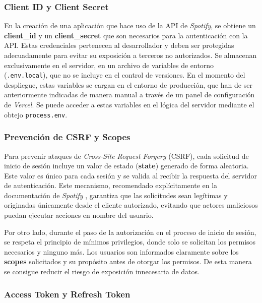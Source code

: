 \subsubsection*{Client ID y Client Secret}

En la creación de una aplicación que hace uso de la API de \textit{Spotify}, se obtiene un \textbf{client\_id} y un \textbf{client\_secret} que son necesarios para la autenticación con la API. Estas credenciales pertenecen al desarrollador y deben ser protegidas adecuadamente para evitar su exposición a terceros no autorizados. Se almacenan exclusivamente en el servidor, en un archivo de variables de entorno (\texttt{.env.local}), que no se incluye en el control de versiones. En el momento del despliegue, estas variables se cargan en el entorno de producción, que han de ser anteriormente indicadas de manera manual a través de un panel de configuración de \textit{Vercel}. Se puede acceder a estas variables en el lógica del servidor mediante el obtejo \texttt{process.env}.

\subsubsection*{Prevención de CSRF y Scopes}

Para prevenir ataques de \textit{Cross-Site Request Forgery} (CSRF), cada solicitud de inicio de sesión incluye un valor de estado (\textbf{state}) generado de forma aleatoria. Este valor es único para cada sesión y se valida al recibir la respuesta del servidor de autenticación. Este mecanismo, recomendado explícitamente en la documentación de \textit{Spotify} \cite{spotifyAuthCodeFlow2025}, garantiza que las solicitudes sean legítimas y originadas únicamente desde el cliente autorizado, evitando que actores maliciosos puedan ejecutar acciones en nombre del usuario.

Por otro lado, durante el paso de la autorización en el proceso de inicio de sesión, se respeta el principio de mínimos privilegios, donde solo se solicitan los permisos necesarios y ninguno más. Los usuarios son informados claramente sobre los \textbf{scopes} solicitados y su propósito antes de otorgar los permisos. De esta manera se consigue reducir el riesgo de exposición innecesaria de datos.

\subsubsection*{Access Token y Refresh Token}

